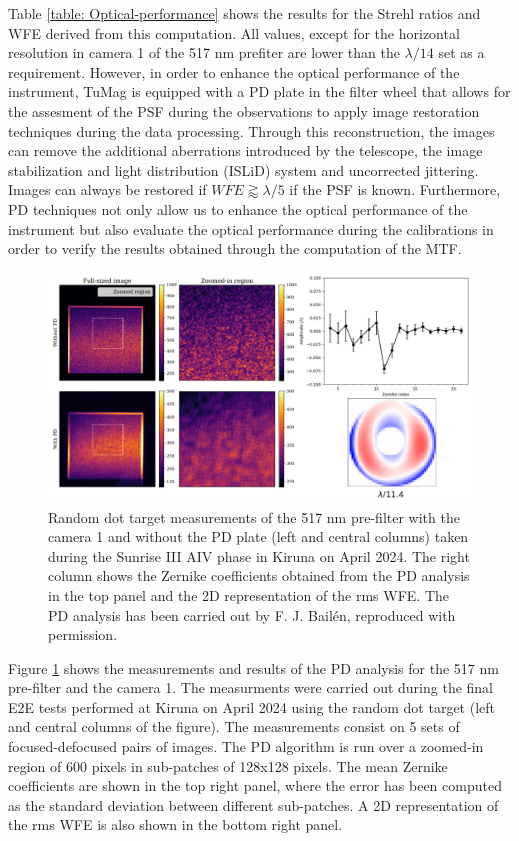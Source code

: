 Table \ref{table: Optical-performance} shows the results for the Strehl ratios and WFE derived from this computation. All values, except for the horizontal resolution in camera 1 of the 517 nm prefiter are lower than the $\lambda/14$ set as a requirement. However, in order to enhance the optical performance of the instrument, TuMag is equipped with a PD plate in the filter wheel that allows for the assesment of the PSF during the observations to apply image restoration techniques during the data processing. Through this reconstruction, the images can remove the additional aberrations introduced by the telescope, the image stabilization and light distribution (ISLiD) system and uncorrected jittering. Images can always be restored if $WFE \gtrapprox \lambda / 5$ \citep{restoration-limit} if the PSF is known. Furthermore, PD techniques not only allow us to enhance the optical performance of the instrument but also evaluate the optical performance during the calibrations in order to verify the results obtained through the computation of the MTF. 

\begin{figure}[t]
    \includegraphics[width=\textwidth]{figures/TuMag/PD_e2e.pdf}
    \caption[E2E PD analysis of TuMag's optical performance.]{Random dot target measurements of the 517 nm pre-filter with the camera 1 and without the PD plate (left and central columns) taken during the Sunrise III AIV phase in Kiruna on April 2024. The right column shows the Zernike coefficients obtained from the PD analysis in the top panel and the 2D representation of the rms WFE. The PD analysis has been carried out by F. J. Bailén, reproduced with permission.}
      \label{tumag : PD}
\end{figure}

Figure \ref{tumag : PD} shows the measurements and results of the PD analysis for the 517 nm pre-filter and the camera 1. The measurments were carried out during the final E2E tests performed at Kiruna on April 2024 using the random dot target (left and central columns of the figure). The measurements consist on 5 sets of focused-defocused pairs of images. The PD algorithm is run over a zoomed-in region of 600 pixels in sub-patches of 128x128 pixels. The mean Zernike coefficients are shown in the top right panel, where the error has been computed as the standard deviation between different sub-patches. A 2D representation of the rms WFE is also shown in the bottom right panel. 


